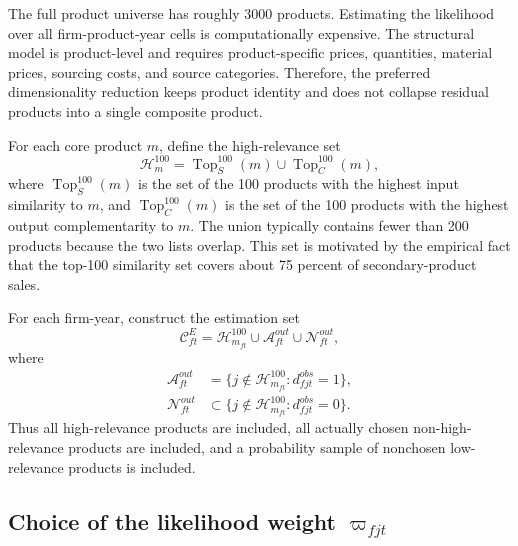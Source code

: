 \documentclass[11pt,a4paper]{article}
\newcommand{\mc}{\mathcal}
\begin{document}
The full product universe has roughly 3000 products. Estimating the likelihood over all firm-product-year cells is computationally expensive. The structural model is product-level and requires product-specific prices, quantities, material prices, sourcing costs, and source categories. Therefore, the preferred dimensionality reduction keeps product identity and does not collapse residual products into a single composite product.

For each core product $m$, define the high-relevance set
\begin{equation}
    \mc{H}_{m}^{100}
    =\operatorname{Top}^{100}_{S}(m)\cup \operatorname{Top}^{100}_{C}(m),
    \label{eq:high_relevance_set}
\end{equation}
where $\operatorname{Top}^{100}_{S}(m)$ is the set of the 100 products with the highest input similarity to $m$, and $\operatorname{Top}^{100}_{C}(m)$ is the set of the 100 products with the highest output complementarity to $m$. The union typically contains fewer than 200 products because the two lists overlap. This set is motivated by the empirical fact that the top-100 similarity set covers about 75 percent of secondary-product sales.

For each firm-year, construct the estimation set
\begin{equation}
    \mc{C}^{E}_{ft}
    =\mc{H}^{100}_{m_{ft}}
    \cup \mc{A}^{out}_{ft}
    \cup \mc{N}^{out}_{ft},
    \label{eq:estimation_choice_set}
\end{equation}
where
\begin{align*}
    \mc{A}^{out}_{ft}
    &=\{j\notin\mc{H}^{100}_{m_{ft}}: d^{obs}_{fjt}=1\},\\
    \mc{N}^{out}_{ft}
    &\subset \{j\notin\mc{H}^{100}_{m_{ft}}: d^{obs}_{fjt}=0\}.
\end{align*}
Thus all high-relevance products are included, all actually chosen non-high-relevance products are included, and a probability sample of nonchosen low-relevance products is included.

\subsection{Choice of the likelihood weight \texorpdfstring{$\varpi_{fjt}$}{varpi}}
\end{document}
